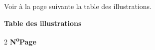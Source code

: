 Voir à la page suivante la table des illustrations.

\fi
\clearpage
{}
\thispagestyle{illustrationstable}

\begin{center}
{\large\bfseries Table des illustrations\par}
\end{center}
\vspace{-0.4em}
\enlargethispage{4\baselineskip}

\iffalse
\begin{multicols}{2}
\fontsize{7}{7.5}\selectfont
\setlength{\columnsep}{1em}
\noindent\textbf{N\textsuperscript{o}\hfill Page}


\end{multicols}
